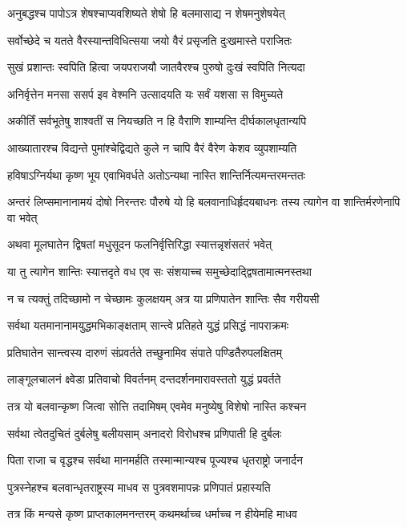 \twolineshloka
{अनुबद्धश्च पापोऽत्र शेषश्चाप्यवशिष्यते}
{शेषो हि बलमासाद्य न शेषमनुशेषयेत्}


\twolineshloka
{सर्वोच्छेदे च यतते वैरस्यान्तविधित्सया}
{जयो वैरं प्रसृजति दुःखमास्ते पराजितः}


\twolineshloka
{सुखं प्रशान्तः स्वपिति हित्वा जयपराजयौ}
{जातवैरश्च पुरुषो दुःखं स्वपिति नित्यदा}


\twolineshloka
{अनिर्वृत्तेन मनसा ससर्प इव वेश्मनि}
{उत्सादयति यः सर्वं यशसा स विमुच्यते}


\twolineshloka
{अकीर्तिं सर्वभूतेषु शाश्वतीं स नियच्छति}
{न हि वैराणि शाम्यन्ति दीर्घकालधृतान्यपि}


\twolineshloka
{आख्यातारश्च विद्यन्ते पुमांश्चेद्विद्यते कुले}
{न चापि वैरं वैरेण केशव व्युपशाम्यति}


\twolineshloka
{हविषाऽग्निर्यथा कृष्ण भूय एवाभिवर्धते}
{अतोऽन्यथा नास्ति शान्तिर्नित्यमन्तरमन्ततः}


\threelineshloka
{अन्तरं लिप्समानानामयं दोषो निरन्तरः}
{पौरुषे यो हि बलवानाधिर्हृदयबाधनः}
{तस्य त्यागेन वा शान्तिर्मरणेनापि वा भवेत्}


\twolineshloka
{अथवा मूलघातेन द्विषतां मधुसूदन}
{फलनिर्वृत्तिरिद्धा स्यात्तन्नृशंसतरं भवेत्}


\twolineshloka
{या तु त्यागेन शान्तिः स्यात्तदृते वध एव सः}
{संशयाच्च समुच्छेदाद्द्विषतामात्मनस्तथा}


\twolineshloka
{न च त्यक्तुं तदिच्छामो न चेच्छामः कुलक्षयम्}
{अत्र या प्रणिपातेन शान्तिः सैव गरीयसी}


\twolineshloka
{सर्वथा यतमानानामयुद्धमभिकाङ्क्षताम्}
{सान्त्वे प्रतिहते युद्धं प्रसिद्धं नापराक्रमः}


\twolineshloka
{प्रतिघातेन सान्त्वस्य दारुणं संप्रवर्तते}
{तच्छुनामिव संपाते पण्डितैरुपलक्षितम्}


\twolineshloka
{लाङ्गूलचालनं क्ष्वेडा प्रतिवाचो विवर्तनम्}
{दन्तदर्शनमारावस्ततो युद्धं प्रवर्तते}


\twolineshloka
{तत्र यो बलवान्कृष्ण जित्वा सोत्ति तदामिषम्}
{एवमेव मनुष्येषु विशेषो नास्ति कश्चन}


\twolineshloka
{सर्वथा त्वेतदुचितं दुर्बलेषु बलीयसाम्}
{अनादरो विरोधश्च प्रणिपाती हि दुर्बलः}


\twolineshloka
{पिता राजा च वृद्धश्च सर्वथा मानमर्हति}
{तस्मान्मान्यश्च पूज्यश्च धृतराष्ट्रो जनार्दन}


\twolineshloka
{पुत्रस्नेहश्च बलवान्धृतराष्ट्रस्य माधव}
{स पुत्रवशमापन्नः प्रणिपातं प्रहास्यति}


\twolineshloka
{तत्र किं मन्यसे कृष्ण प्राप्तकालमनन्तरम्}
{कथमर्थाच्च धर्माच्च न हीयेमहि माधव}


